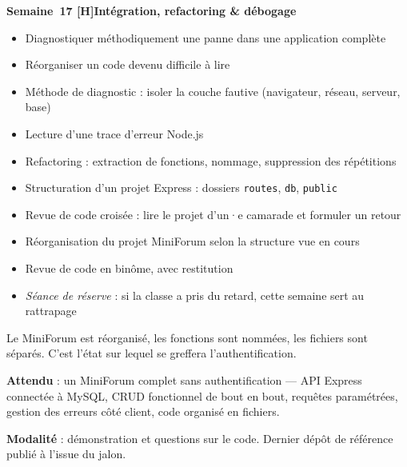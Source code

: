 \documentclass[a4paper,11pt]{article}
\newcommand{\semainetitre}[4]{%
  \needspace{9\baselineskip}%
  \vspace{8pt}
  \noindent
  \begin{tcolorbox}[
    enhanced, colback=cfptBlack, colframe=cfptBlack,
    boxrule=0pt, arc=3pt, boxsep=0pt,
    left=8pt, right=90pt, top=4pt, bottom=4pt,
    overlay={%
      \node[anchor=east, fill=cfptYellow, text=cfptBlack,
            rounded corners=2pt, inner xsep=6pt, inner ysep=3pt,
            font=\scriptsize\bfseries]
        at ([xshift=-6pt]frame.east) {#3};}
  ]
  \color{white}\bfseries\small Semaine~#1 \quad\textcolor{cfptYellow}{[#4]}\quad #2
  \end{tcolorbox}
  \vspace{-4pt}
}
\newcommand{\contenutitre}[1]{%
  \vspace{4pt}
  \noindent{\small\color{accentBlue}\textbf{#1}}\vspace{2pt}
}
\begin{document}
\semainetitre{17}{Intégration, refactoring \& débogage}{3h cours / 4h TP}{H}
\begin{tcolorbox}[semaine]
\begin{tcolorbox}[objectifs]
\begin{itemize}
  \item Diagnostiquer méthodiquement une panne dans une application complète
  \item Réorganiser un code devenu difficile à lire
\end{itemize}
\end{tcolorbox}
\vspace{4pt}
\contenutitre{Cours}
\begin{itemize}
  \item Méthode de diagnostic : isoler la couche fautive (navigateur, réseau, serveur, base)
  \item Lecture d'une trace d'erreur Node.js
  \item Refactoring : extraction de fonctions, nommage, suppression des répétitions
  \item Structuration d'un projet Express : dossiers \texttt{routes}, \texttt{db}, \texttt{public}
  \item Revue de code croisée : lire le projet d'un·e camarade et formuler un retour
\end{itemize}
\contenutitre{Travaux pratiques}
\begin{itemize}
  \item Réorganisation du projet MiniForum selon la structure vue en cours
  \item Revue de code en binôme, avec restitution
  \item \textit{Séance de réserve} : si la classe a pris du retard, cette semaine sert au rattrapage
\end{itemize}
\end{tcolorbox}
\begin{tcolorbox}[filrouge={Un projet propre et lisible}]
\small Le MiniForum est réorganisé, les fonctions sont nommées, les fichiers sont séparés. C'est l'état sur lequel se greffera l'authentification.
\end{tcolorbox}

\begin{tcolorbox}[jalon, title={Jalon 3 --- fin de semaine 17 (10\%)}]
\small
\textbf{Attendu} : un MiniForum complet sans authentification --- API Express connectée à MySQL, CRUD fonctionnel de bout en bout, requêtes paramétrées, gestion des erreurs côté client, code organisé en fichiers.

\textbf{Modalité} : démonstration et questions sur le code. Dernier dépôt de référence publié à l'issue du jalon.
\end{tcolorbox}
\end{document}
